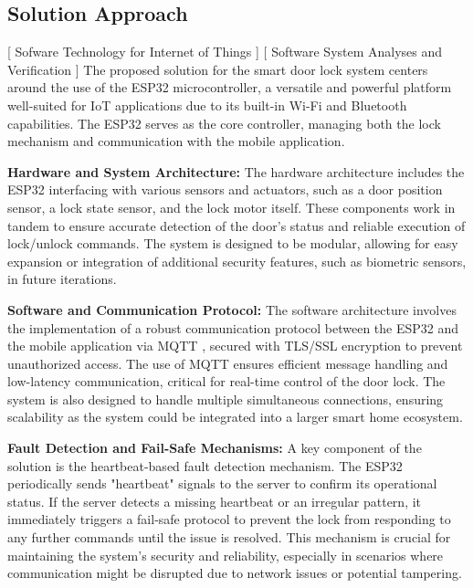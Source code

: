 \subsection{Solution Approach}
[ Sofware Technology for Internet of Things ] [ Software System Analyses and Verification ]
\newline
The proposed solution for the smart door lock system centers around the use of the ESP32 microcontroller, a versatile and powerful platform well-suited for IoT applications due to its built-in Wi-Fi and Bluetooth capabilities. The ESP32 serves as the core controller, managing both the lock mechanism and communication with the mobile application.

\textbf{Hardware and System Architecture:}
The hardware architecture includes the ESP32 interfacing with various sensors and actuators, such as a door position sensor, a lock state sensor, and the lock motor itself. These components work in tandem to ensure accurate detection of the door’s status and reliable execution of lock/unlock commands. The system is designed to be modular, allowing for easy expansion or integration of additional security features, such as biometric sensors, in future iterations.

\textbf{Software and Communication Protocol:}
The software architecture involves the implementation of a robust communication protocol between the ESP32 and the mobile application via MQTT \cite{mqtt-protocol}, secured with TLS/SSL encryption to prevent unauthorized access. The use of MQTT ensures efficient message handling and low-latency communication, critical for real-time control of the door lock. The system is also designed to handle multiple simultaneous connections, ensuring scalability as the system could be integrated into a larger smart home ecosystem.

\textbf{Fault Detection and Fail-Safe Mechanisms:}
A key component of the solution is the heartbeat-based fault detection mechanism. The ESP32 periodically sends "heartbeat" signals to the server to confirm its operational status. If the server detects a missing heartbeat or an irregular pattern, it immediately triggers a fail-safe protocol to prevent the lock from responding to any further commands until the issue is resolved. This mechanism is crucial for maintaining the system’s security and reliability, especially in scenarios where communication might be disrupted due to network issues or potential tampering.

